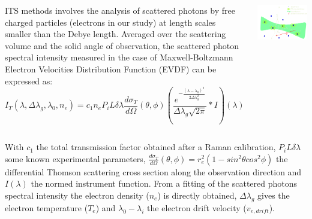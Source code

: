 \documentclass{beamer}
\begin{document}
\begin{frame}[t]
\begin{tcbposter}
{\begin{columns}
    \begin{column}{0.45\paperwidth}
    ITS methods involves the analysis of scattered photons by free charged particles (electrons in our study) at length scales smaller than the Debye length. Averaged over the scattering volume and the solid angle of observation, the scattered photon spectral intensity measured in the case of Maxwell-Boltzmann Electron Velocities Distribution Function (EVDF) can be expressed as:
    \begin{equation}
    I_{T}(\lambda,\Delta \lambda_{g}, \lambda_{0},n_{e})=c_{1}n_{e} P_{i}L\delta \lambda \frac{d \sigma_{T}}{d \Omega}(\theta, \phi) \left( \frac{e^{- \frac{(\lambda-\lambda_{0})^{2}}{2 \Delta \lambda_{g}^{2}}}}{\Delta \lambda_{g} \sqrt{2 \pi}} \ast I \right) (\lambda)     
    \end{equation}
    \end{column}

    \begin{column}{0.2\paperwidth}
    \vspace*{-0.02\paperwidth}
    \includegraphics[width=0.2\paperwidth]{Scattering_Configuration_angles_bright.pdf}
    \end{column}
\end{columns}
    With $c_{1}$ the total transmission factor obtained after a Raman calibration, $P_{i} L \delta \lambda$ some known experimental parameters,  $\frac{d \sigma_{T}}{d \Omega}(\theta, \phi)= r_{e}^{2}(1-sin^{2}\theta cos^{2} \phi)$ the differential Thomson scattering cross section along the observation direction and $I(\lambda)$ the normed instrument function. From a fitting of the scattered photons spectral intensity  the electron density ($n_{e}$) is directly obtained, $\Delta \lambda_{g}$ gives the electron temperature ($T_{e}$) and $\lambda_{0}-\lambda_{i}$ the electron drift velocity ($v_{e,drift}$).
    
}
\end{tcbposter}
\end{frame}
\end{document}

